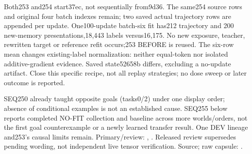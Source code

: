 \documentclass{article}
\begin{document}
Both253 and254 start37ec, not sequentially from9d36. The same254 source rows
and original four batch indexes remain; two saved actual trajectory rows
are appended per update. One100-update batch-six fit has212 trajectory and
200 new-memory presentations,18,443 labels versus16,175. No new exposure,
teacher, rewritten target or reference refit occurs;253 BEFORE is reused.
The six-row mean changes existing-label normalization: neither equal-token
nor isolated additive-gradient evidence. Saved state52658b differs, excluding
a no-update artifact. Close this specific recipe, not all replay strategies;
no dose sweep or later outcome is reported.

SEQ250 already taught opposite goals (tasks0/2) under one display order;
absence of conditional examples is not an established cause. SEQ255 below
reports completed NO-FIT collection and baseline across more worlds/orders,
not the first goal counterexample or a newly learned transfer result.
One DEV lineage and253's causal limits remain. Primary/review:
,
.
Released review supersedes pending wording, not independent live tensor
verification. Source; raw capsule:
.
\end{document}
